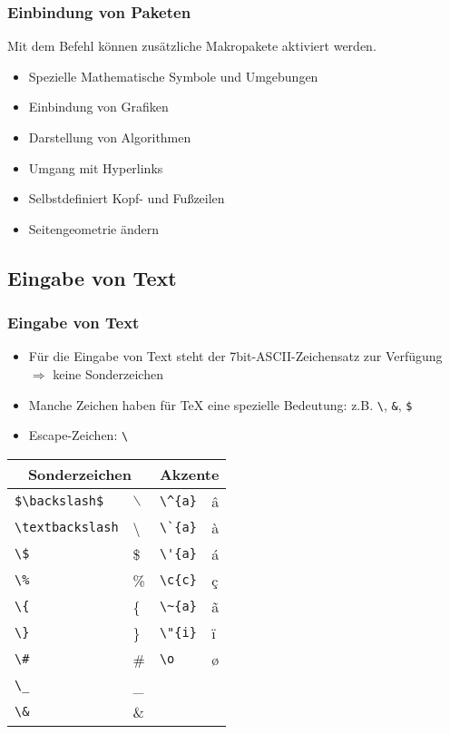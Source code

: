 \begin{frame}[c]
\frametitle{Einbindung von Paketen}

Mit dem Befehl  k\"onnen zus\"atzliche Makropakete aktiviert werden.
\begin{itemize}
\item {} Spezielle Mathematische Symbole und Umgebungen
\item {} Einbindung von Grafiken
\item {} Darstellung von Algorithmen
\item {} Umgang mit Hyperlinks
\item {} Selbstdefiniert Kopf- und Fu\ss{}zeilen
\item {} Seitengeometrie \"andern
\end{itemize}
\end{frame}

\subsection{Eingabe von Text}

\begin{frame}[c,fragile]
\frametitle{Eingabe von Text}

\begin{itemize}
\item F\"ur die Eingabe von Text steht der 7bit-ASCII-Zeichensatz zur Verf\"ugung $\Longrightarrow$ keine Sonderzeichen
\item Manche Zeichen haben f\"ur \TeX{} eine spezielle Bedeutung: z.B.{} \verb+\+, \verb+&+, \verb+$+
\item \glqq Escape\grqq-Zeichen: \verb+\+
\end{itemize}

\begin{block}{}
\begin{center}

\begin{tabular}{ll|ll}
\multicolumn{2}{c}{\textbf{Sonderzeichen}} & \multicolumn{2}{c}{\textbf{Akzente}} \\ \hline
\verb+$\backslash$+ & $\backslash$ & \verb+\^{a}+ & \^{a} \\
\verb|\textbackslash| & \textbackslash & \verb+\`{a}+  & \`{a} \\
\verb+\$+ & \$ & \verb+\'{a}+  & \'{a} \\
\verb+\%+ & \% & \verb+\c{c}+  & \c{c} \\
\verb+\{+ & \{ & \verb+\~{a}+  & \~{a} \\
\verb+\}+ & \} & \verb+\"{i}+  & \"{i} \\
\verb+\#+ & \# & \verb+\o+     & \o \\
\verb+\_+ & \_ \\
\verb+\&+ & \& &
\end{tabular}

\end{center}
\end{block}

\end{frame}

